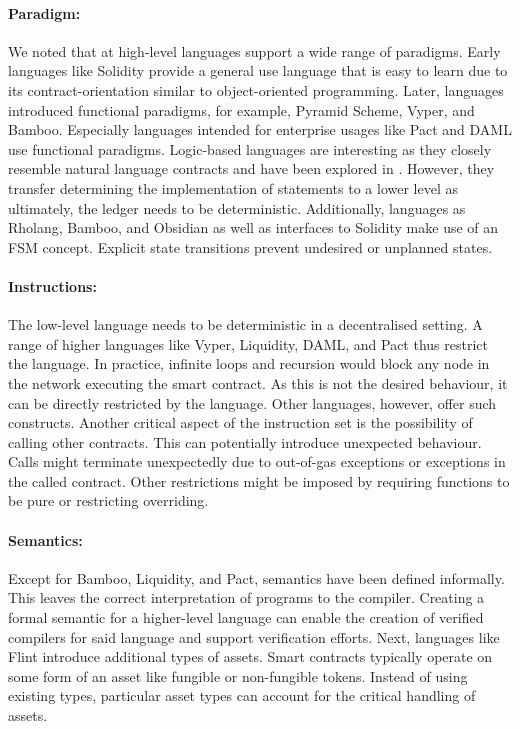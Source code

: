 \paragraph{Paradigm:} We noted that at high-level languages support a wide range of paradigms. 
Early languages like Solidity provide a general use language that is easy to learn due to its contract-orientation similar to object-oriented programming.
Later, languages introduced functional paradigms, for example, Pyramid Scheme, Vyper, and Bamboo.
Especially languages intended for enterprise usages like Pact and DAML use functional paradigms.
Logic-based languages are interesting as they closely resemble natural language contracts and have been explored in \cite{Idelberger2016}. However, they transfer determining the implementation of statements to a lower level as ultimately, the ledger needs to be deterministic.
Additionally, languages as Rholang, Bamboo, and Obsidian as well as interfaces to Solidity \cite{Mavridou2018} make use of an FSM concept. Explicit state transitions prevent undesired or unplanned states.


\paragraph{Instructions:} The low-level language needs to be deterministic in a decentralised setting.
A range of higher languages like Vyper, Liquidity, DAML, and Pact thus restrict the language. In practice, infinite loops and recursion would block any node in the network executing the smart contract. As this is not the desired behaviour, it can be directly restricted by the language. Other languages, however, offer such constructs.
Another critical aspect of the instruction set is the possibility of calling other contracts. This can potentially introduce unexpected behaviour. Calls might terminate unexpectedly due to out-of-gas exceptions or exceptions in the called contract. 
Other restrictions might be imposed by requiring functions to be pure or restricting overriding.

\paragraph{Semantics:} Except for Bamboo, Liquidity, and Pact, semantics have been defined informally. This leaves the correct interpretation of programs to the compiler. Creating a formal semantic for a higher-level language can enable the creation of verified compilers for said language and support verification efforts.
Next, languages like Flint introduce additional types of assets. Smart contracts typically operate on some form of an asset like fungible or non-fungible tokens. Instead of using existing types, particular asset types can account for the critical handling of assets.

